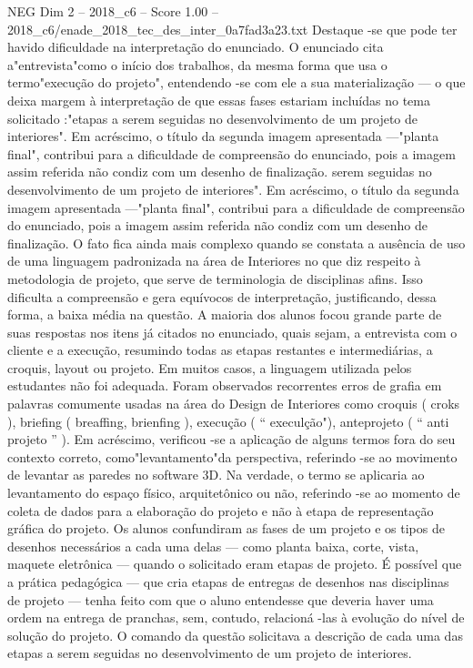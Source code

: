\begin{textsample}{NEG Dim 2 – 2018\_c6 – Score 1.00 – 2018\_c6/enade\_2018\_tec\_des\_inter\_0a7fad3a23.txt}
Destaque -se que pode ter havido dificuldade na interpretação do enunciado.
O enunciado cita a"entrevista"como o início dos trabalhos, da mesma forma que usa o termo"execução do projeto", entendendo -se com ele a sua materialização — o que deixa margem à interpretação de que essas fases estariam incluídas no tema solicitado :"etapas a serem seguidas no desenvolvimento de um projeto de interiores".
Em acréscimo, o título da segunda imagem apresentada —"planta final", contribui para a dificuldade de compreensão do enunciado, pois a imagem assim referida não condiz com um desenho de finalização. serem seguidas no desenvolvimento de um projeto de interiores".
Em acréscimo, o título da segunda imagem apresentada —"planta final", contribui para a dificuldade de compreensão do enunciado, pois a imagem assim referida não condiz com um desenho de finalização.
O fato fica ainda mais complexo quando se constata a ausência de uso de uma linguagem padronizada na área de Interiores no que diz respeito à metodologia de projeto, que serve de terminologia de disciplinas afins.
Isso dificulta a compreensão e gera equívocos de interpretação, justificando, dessa forma, a baixa média na questão.
A maioria dos alunos focou grande parte de suas respostas nos itens já citados no enunciado, quais sejam, a entrevista com o cliente e a execução, resumindo todas as etapas restantes e intermediárias, a croquis, layout ou projeto.
Em muitos casos, a linguagem utilizada pelos estudantes não foi adequada.
Foram observados recorrentes erros de grafia em palavras comumente usadas na área do Design de Interiores como croquis ( croks ), briefing ( breaffing, brienfing ), execução ( “ execulção"), anteprojeto ( “ anti projeto ” ).
Em acréscimo, verificou -se a aplicação de alguns termos fora do seu contexto correto, como"levantamento"da perspectiva, referindo -se ao movimento de levantar as paredes no software 3D.
Na verdade, o termo se aplicaria ao levantamento do espaço físico, arquitetônico ou não, referindo -se ao momento de coleta de dados para a elaboração do projeto e não à etapa de representação gráfica do projeto.
Os alunos confundiram as fases de um projeto e os tipos de desenhos necessários a cada uma delas — como planta baixa, corte, vista, maquete eletrônica — quando o solicitado eram etapas de projeto.
É possível que a prática pedagógica — que cria etapas de entregas de desenhos nas disciplinas de projeto — tenha feito com que o aluno entendesse que deveria haver uma ordem na entrega de pranchas, sem, contudo, relacioná -las à evolução do nível de solução do projeto.
O comando da questão solicitava a descrição de cada uma das etapas a serem seguidas no desenvolvimento de um projeto de interiores.

\end{textsample}
